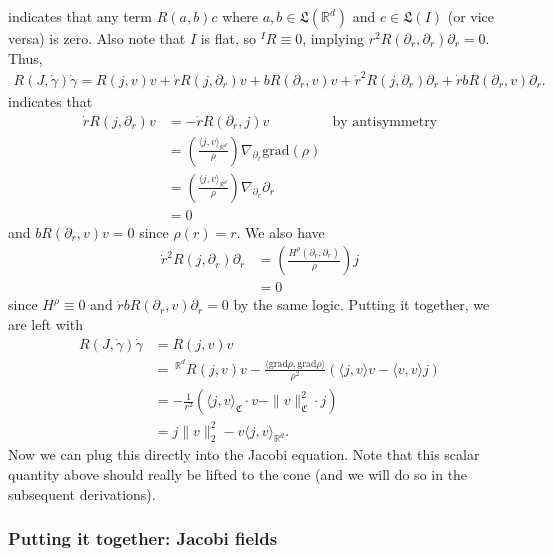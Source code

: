 \documentclass{article}
\begin{document}
 indicates that any term $R(a,b)c$ where $a,b \in \mathfrak{L}(\mathbb{R}^d)$ and $c \in \mathfrak{L}(I)$ (or vice versa) is zero. Also note that $I$ is flat, so $^IR \equiv0$, implying $r^2R(\partial_r, \partial_r)\partial_r = 0$. Thus,
\begin{align}
    R(J, \dot\gamma)\dot\gamma = R(j, v)v + \dot rR(j, \partial_r)v + bR(\partial_r, v)v + \dot r^2R(j, \partial_r)\partial_r + \dot rbR(\partial_r, v)\partial_r.
\end{align}
 indicates that 
\begin{align}
    \dot rR(j, \partial_r)v &= -\dot rR(\partial_r, j)v & \text{by antisymmetry}\\
    &= \left(\frac{\langle j, v\rangle_{\mathbb{R}^d}}{\rho}\right)\nabla_{\partial_r}\text{grad}(\rho) \\
    &= \left(\frac{\langle j, v\rangle_{\mathbb{R}^d}}{\rho}\right)\nabla_{\partial_r}\partial_r \\
    &= 0
\end{align}
and $bR(\partial_r, v)v = 0$ since $\rho(r) = r$. We also have
\begin{align}
    \dot r^2R(j, \partial_r)\partial_r &= \left(\frac{H^{\rho}(\partial_r, \partial_r)}{\rho}\right)j \\
    &= 0
\end{align}
since $H^{\rho}\equiv 0$ and $\dot rbR(\partial_r, v)\partial_r = 0$ by the same logic. Putting it together, we are left with
\begin{align}
    R(J, \dot\gamma)\dot\gamma &= R(j,v)v \\
     &= \,^{\mathbb{R}^d}R(j,v)v - \frac{\langle \text{grad} \rho, \text{grad}\rho\rangle}{\rho^2}\left(\langle j, v \rangle v -  \langle v, v\rangle j\right) \\
     &= -\frac{1}{r^2}\left(\langle j, v\rangle_{\mathfrak{C}} \cdot v - \|v\|^2_{\mathfrak{C}}\cdot j\right) \\
     &= j\|v\|^2_{2} - v\langle j,v\rangle_{\mathbb{R}^d}. \label{eq: jacobi riemann expression}
\end{align}
Now we can plug this directly into the Jacobi equation. Note that this scalar quantity above should really be lifted to the cone (and we will do so in the subsequent derivations).

\subsubsection{Putting it together: Jacobi fields}
\end{document}
